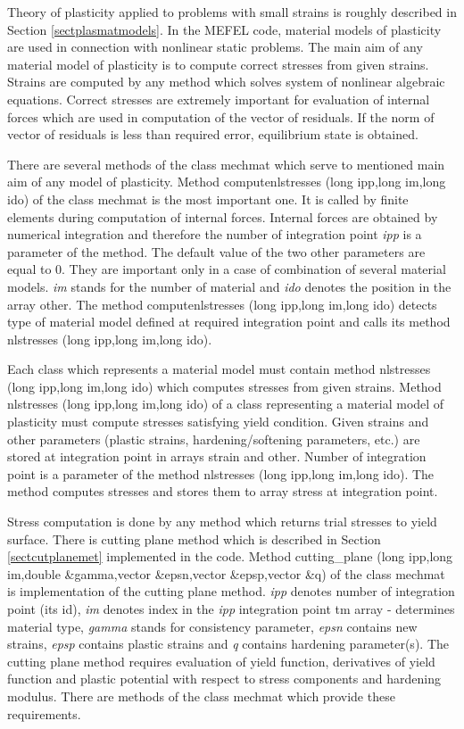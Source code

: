 Theory of plasticity applied to problems with small strains is roughly described in Section \ref{sectplasmatmodels}.
In the MEFEL code, material models of plasticity are used in connection with nonlinear static problems.
The main aim of any material model of plasticity is to compute correct stresses from given strains.
Strains are computed by any method which solves system of nonlinear algebraic equations. Correct stresses
are extremely important for evaluation of internal forces which are used in computation of the vector of residuals.
If the norm of vector of residuals is less than required error, equilibrium state is obtained.

There are several methods of the class {\sf mechmat} which serve to mentioned main aim of any model of plasticity.
Method {\sf computenlstresses (long ipp,long im,long ido)} of the class {\sf mechmat} is the most important one.
It is called by finite elements during computation of internal forces. Internal forces are obtained by numerical
integration and therefore the number of integration point {\it ipp} is a parameter of the method. The default
value of the two other parameters are equal to 0. They are important only in a case of combination of several
material models. {\it im} stands for the number of material and {\it ido} denotes the position in the array {\sf other}.
The method {\sf computenlstresses (long ipp,long im,long ido)} detects type of material model defined at
required integration point and calls its method {\sf nlstresses (long ipp,long im,long ido)}.

Each class which represents a material model must contain method {\sf nlstresses (long ipp,long im,long ido)} which computes
stresses from given strains.
Method {\sf nlstresses (long ipp,long im,long ido)} of a class representing a material model of plasticity must compute
stresses satisfying yield condition. Given strains and other parameters (plastic strains, hardening/softening parameters, etc.)
are stored at integration point in arrays {\sf strain} and {\sf other}. Number of integration point is a parameter of the
method {\sf nlstresses (long ipp,long im,long ido)}. The method computes stresses and stores them to array {\sf stress} at integration
point.

Stress computation is done by any method which returns trial stresses to yield surface. There is cutting plane method
 which is described in Section \ref{sectcutplanemet} implemented in the code. Method
{\sf cutting\_plane (long ipp,long im,double \&gamma,vector \&epsn,vector \&epsp,vector \&q)} of the class {\sf mechmat} is
implementation of the cutting plane method. {\it ipp} denotes number of integration point (its id), {\it im} denotes index in the {\it ipp} integration point {\sf tm} array 
- determines material type, {\it gamma} stands for consistency parameter, {\it epsn} contains new strains, {\it epsp} contains plastic strains and {\it q}
contains hardening parameter(s). The cutting plane method requires evaluation of yield function, derivatives of
yield function and plastic potential with respect to stress components and hardening modulus. There are methods
of the class {\sf mechmat} which provide these requirements.

